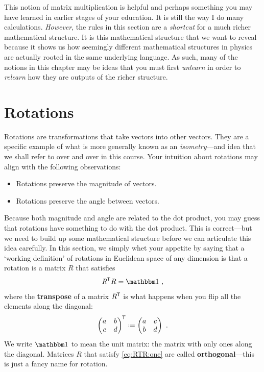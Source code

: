 This notion of matrix multiplication is helpful and perhaps something you may have learned in earlier stages of your education. It is still the way I do many calculations. \emph{However}, the rules in this section are a \emph{shortcut} for a much richer mathematical structure. It is this mathematical structure that we want to reveal because it shows us how seemingly different mathematical structures in physics are actually rooted in the same underlying language. As such, many of the notions in this chapter may be ideas that you must first \emph{unlearn} in order to \emph{relearn} how they are outputs of the richer structure.


\section{Rotations}\label{sec:Euclidean:three:space:rotations}

Rotations are transformations that take vectors into other vectors. They are a specific example of what is more generally known as an \emph{isometry}---and idea that we shall refer to over and over in this course. Your intuition about rotations may align with the following observations:
\begin{itemize}
    \item Rotations preserve the magnitude of vectors.
    \item Rotations preserve the angle between vectors. 
\end{itemize}
Because both magnitude and angle are related to the dot product, you may guess that rotations have something to do with the dot product. This is correct---but we need to build up some mathematical structure before we can articulate this idea carefully. In this section, we simply whet your appetite by saying that a `working definition' of rotations in Euclidean space of any dimension is that a rotation is a matrix $R$ that satisfies
\begin{align}
    R^\trans R = \one \ ,
    \label{eq:RTR:one}
\end{align}
where the \textbf{transpose} of a matrix $R^{\mkern-1.5mu\mathsf{T}}$ is what happens when you flip all the elements along the diagonal:
\begin{align}
    \begin{pmatrix}
        a & b \\
        c & d
    \end{pmatrix}^\trans \defeq
    \begin{pmatrix}
        a & c \\
        b & d
    \end{pmatrix} \ .
\end{align}
We write $\one$ to mean the unit matrix: the matrix with only ones along the diagonal. Matrices $R$ that satisfy \eqref{eq:RTR:one} are called \textbf{orthogonal}---this is just a fancy name for rotation. 


